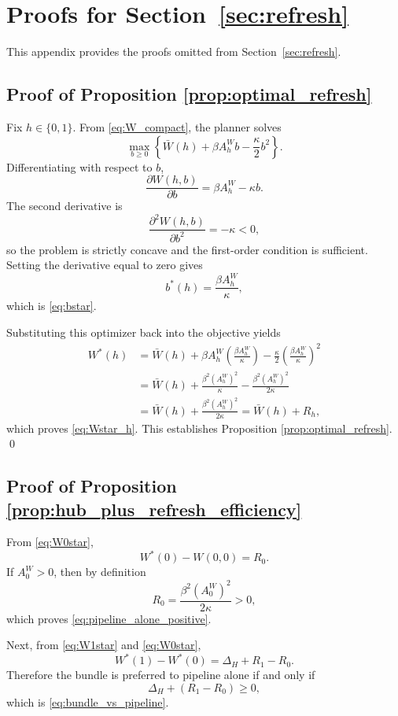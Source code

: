 \section{Proofs for Section~\ref{sec:refresh}}

This appendix provides the proofs omitted from Section~\ref{sec:refresh}.

\subsection{Proof of Proposition \ref{prop:optimal_refresh}}

Fix $h\in\{0,1\}$. From \eqref{eq:W_compact}, the planner solves
\[
\max_{b\ge 0}\left\{\bar W(h)+\beta A_h^W b-\frac{\kappa}{2}b^2\right\}.
\]
Differentiating with respect to $b$,
\[
\frac{\partial W(h,b)}{\partial b}=\beta A_h^W-\kappa b.
\]
The second derivative is
\[
\frac{\partial^2 W(h,b)}{\partial b^2}=-\kappa<0,
\]
so the problem is strictly concave and the first-order condition is sufficient. Setting the derivative equal to zero gives
\[
b^*(h)=\frac{\beta A_h^W}{\kappa},
\]
which is \eqref{eq:bstar}.

Substituting this optimizer back into the objective yields
\begin{align*}
W^*(h)
&=
\bar W(h)
+
\beta A_h^W
\left(\frac{\beta A_h^W}{\kappa}\right)
-
\frac{\kappa}{2}
\left(\frac{\beta A_h^W}{\kappa}\right)^2 \\
&=
\bar W(h)
+
\frac{\beta^2(A_h^W)^2}{\kappa}
-
\frac{\beta^2(A_h^W)^2}{2\kappa} \\
&=
\bar W(h)+\frac{\beta^2(A_h^W)^2}{2\kappa}
=
\bar W(h)+R_h,
\end{align*}
which proves \eqref{eq:Wstar_h}. This establishes Proposition \ref{prop:optimal_refresh}.
\qed

\subsection{Proof of Proposition \ref{prop:hub_plus_refresh_efficiency}}

From \eqref{eq:W0star},
\[
W^*(0)-W(0,0)=R_0.
\]
If $A_0^W>0$, then by definition
\[
R_0=\frac{\beta^2(A_0^W)^2}{2\kappa}>0,
\]
which proves \eqref{eq:pipeline_alone_positive}.

Next, from \eqref{eq:W1star} and \eqref{eq:W0star},
\[
W^*(1)-W^*(0)
=
\Delta_H+R_1-R_0.
\]
Therefore the bundle is preferred to pipeline alone if and only if
\[
\Delta_H+(R_1-R_0)\ge 0,
\]
which is \eqref{eq:bundle_vs_pipeline}.

